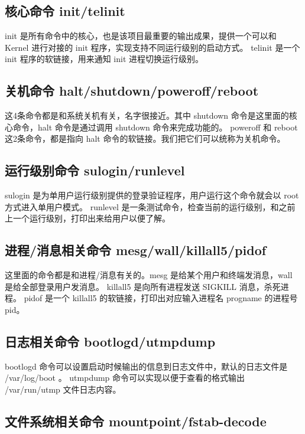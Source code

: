 \subsection{核心命令 init/telinit}

init 是所有命令中的核心，也是该项目最重要的输出成果，提供一个可以和 Kernel
进行对接的 init 程序，实现支持不同运行级别的启动方式。 telinit 是一个
init 程序的软链接，用来通知 init 进程切换运行级别。

\subsection{关机命令 halt/shutdown/poweroff/reboot}

这4条命令都是和系统关机有关，名字很接近。其中 shutdown
命令是这里面的核心命令，halt 命令是通过调用 shutdown 命令来完成功能的。
poweroff 和 reboot 这2条命令，都是指向 halt
命令的软链接。我们把它们可以统称为关机命令。

\subsection{运行级别命令 sulogin/runlevel}

sulogin 是为单用户运行级别提供的登录验证程序，用户运行这个命令就会以 root
方式进入单用户模式。 runlevel
是一条测试命令，检查当前的运行级别，和之前上一个运行级别，打印出来给用户以便了解。

\subsection{进程/消息相关命令 mesg/wall/killall5/pidof}

这里面的命令都是和进程/消息有关的。mesg 是给某个用户和终端发消息，wall
是给全部登录用户发消息。 killall5 是向所有进程发送 SIGKILL
消息，杀死进程。 pidof 是一个 killall5 的软链接，打印出对应输入进程名
progname 的进程号 pid。

\subsection{日志相关命令 bootlogd/utmpdump}

bootlogd 命令可以设置启动时候输出的信息到日志文件中，默认的日志文件是
/var/log/boot 。 utmpdump 命令可以实现以便于查看的格式输出 /var/run/utmp
文件日志内容。

\subsection{文件系统相关命令 mountpoint/fstab-decode}

